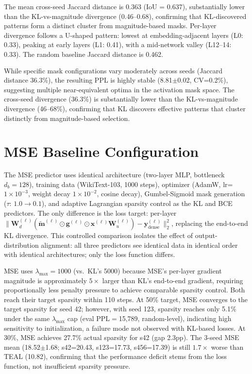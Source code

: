 The mean cross-seed Jaccard distance is 0.363 (IoU = 0.637), substantially lower than the KL-vs-magnitude divergence (0.46--0.68), confirming that KL-discovered patterns form a distinct cluster from magnitude-based masks.
Per-layer divergence follows a U-shaped pattern: lowest at embedding-adjacent layers (L0: 0.33), peaking at early layers (L1: 0.41), with a mid-network valley (L12--14: 0.33). The random baseline Jaccard distance is 0.462.

While specific mask configurations vary moderately across seeds (Jaccard distance 36.3\%), the resulting PPL is highly stable (8.81$\pm$0.02, CV=0.2\%), suggesting multiple near-equivalent optima in the activation mask space.
The cross-seed divergence (36.3\%) is substantially lower than the KL-vs-magnitude divergence (46--68\%), confirming that KL discovers effective patterns that cluster distinctly from magnitude-based selection.


\section{MSE Baseline Configuration}
\label{app:mse_config}

The MSE predictor uses identical architecture (two-layer MLP, bottleneck $d_b{=}128$), training data (WikiText-103, 1000 steps), optimizer (AdamW, lr=$1{\times}10^{-3}$, weight decay $1{\times}10^{-2}$, cosine decay), Gumbel-Sigmoid mask generation ($\tau$: $1.0 \to 0.1$), and adaptive Lagrangian sparsity control as the KL and BCE predictors.
The only difference is the loss target: per-layer $\|\mathbf{W}_d^{(\ell)}(\tilde{\mathbf{m}}^{(\ell)} \odot \mathbf{g}^{(\ell)} \odot \mathbf{x}^{(\ell)} \mathbf{W}_u^{(\ell)}) - \mathbf{y}_{\text{dense}}^{(\ell)}\|_2^2$, replacing the end-to-end KL divergence.
This controlled comparison isolates the effect of output-distribution alignment: all three predictors see identical data in identical order with identical architectures; only the loss function differs.

MSE uses $\lambda_{\max}{=}1000$ (vs.\ KL's 5000) because MSE's per-layer gradient magnitude is approximately $5\times$ larger than KL's end-to-end gradient, requiring proportionally less penalty pressure to achieve comparable sparsity control. Both reach their target sparsity within 110 steps.
At 50\% target, MSE converges to the target sparsity for seed 42; however, with seed 123, sparsity reaches only 5.1\% under the same $\lambda_{\max}$ cap (eval PPL$=$15{,}789, random-level), indicating high sensitivity to initialization, a failure mode not observed with KL-based losses.
At 30\%, MSE achieves 27.7\% actual sparsity for s42 (gap 2.3pp).
The 3-seed MSE mean (18.52$\pm$1.68; s42=20.43, s123=17.73, s456=17.39) is still $1.7\times$ worse than TEAL (10.82), confirming that the performance deficit stems from the loss function, not insufficient sparsity pressure.


